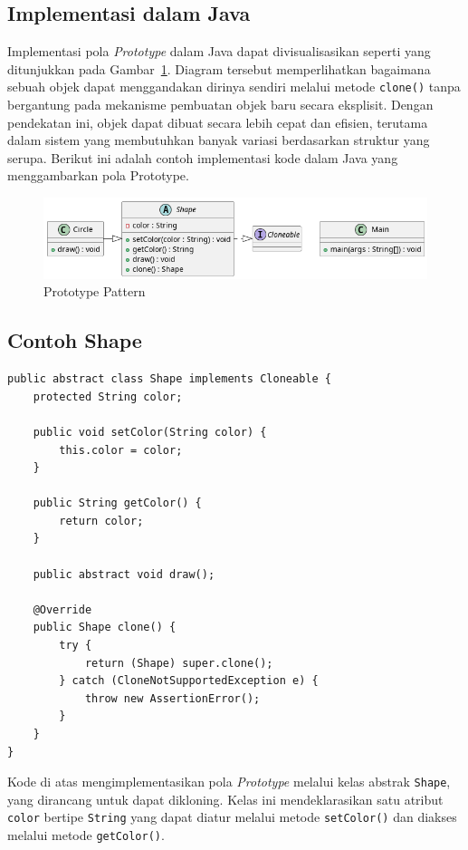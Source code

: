 \subsection{Implementasi dalam Java}

Implementasi pola \textit{Prototype} dalam Java dapat divisualisasikan seperti yang ditunjukkan pada Gambar~\ref{fig:prototype}. Diagram tersebut memperlihatkan bagaimana sebuah objek dapat menggandakan dirinya sendiri melalui metode \texttt{clone()} tanpa bergantung pada mekanisme pembuatan objek baru secara eksplisit. Dengan pendekatan ini, objek dapat dibuat secara lebih cepat dan efisien, terutama dalam sistem yang membutuhkan banyak variasi berdasarkan struktur yang serupa. Berikut ini adalah contoh implementasi kode dalam Java yang menggambarkan pola Prototype.

\begin{figure}[h]
 	\centering
 	\includegraphics[width=.9\textwidth]{../figures/out/prototype.png}
 	\caption{Prototype Pattern}
 	\label{fig:prototype}
\end{figure}

\subsection{Contoh Shape}

\begin{lstlisting}[style=JavaStyle, caption={Implementasi Prototype pada Kelas Shape}, label={lst:prototype-shape}]
public abstract class Shape implements Cloneable {
	protected String color;
	
	public void setColor(String color) {
		this.color = color;
	}
	
	public String getColor() {
		return color;
	}
	
	public abstract void draw();
	
	@Override
	public Shape clone() {
		try {
			return (Shape) super.clone();
		} catch (CloneNotSupportedException e) {
			throw new AssertionError();
		}
	}
}
\end{lstlisting}

Kode di atas mengimplementasikan pola \textit{Prototype} melalui kelas abstrak \texttt{Shape}, yang dirancang untuk dapat dikloning. Kelas ini mendeklarasikan satu atribut \texttt{color} bertipe \texttt{String} yang dapat diatur melalui metode \texttt{setColor()} dan diakses melalui metode \texttt{getColor()}. 

